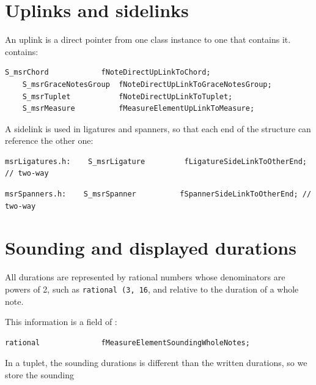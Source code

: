 \section{Uplinks and sidelinks}\label{Uplinks and sidelinks}

An uplink is a direct pointer from one class   instance to one that contains it.  contains:
\begin{lstlisting}[language=CPlusPlus]
    S_msrChord            fNoteDirectUpLinkToChord;
    S_msrGraceNotesGroup  fNoteDirectUpLinkToGraceNotesGroup;
    S_msrTuplet           fNoteDirectUpLinkToTuplet;
    S_msrMeasure          fMeasureElementUpLinkToMeasure;
\end{lstlisting}

A sidelink is used in ligatures and spanners, so that each end of the structure can reference the other one:
\begin{lstlisting}[language=CPlusPlus]
msrLigatures.h:    S_msrLigature         fLigatureSideLinkToOtherEnd; // two-way
\end{lstlisting}

\begin{lstlisting}[language=CPlusPlus]
msrSpanners.h:    S_msrSpanner          fSpannerSideLinkToOtherEnd; // two-way
\end{lstlisting}


\section{Sounding and displayed durations}\label{Sounding and displayed durations}

All durations are represented by rational numbers whose denominators are powers of 2, such as {\tt rational (3, 16}, and relative to the duration of a whole note.

This information is a field of :
\begin{lstlisting}[language=CPlusPlus]
    rational              fMeasureElementSoundingWholeNotes;
\end{lstlisting}

In a tuplet, the sounding durations is different than the written durations, so we store the sounding

